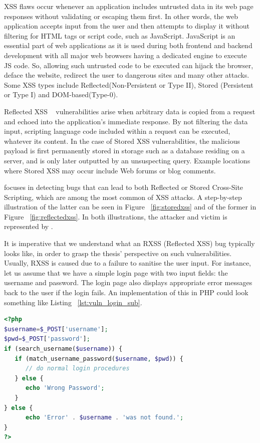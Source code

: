 XSS flaws occur whenever an application includes untrusted data in its web page responses without validating or escaping them first. In other words, the web application accepts input from the user and then attempts to display it without filtering for HTML tags or script code, such as JavaScript. JavaScript is an essential part of web applications as it is used during both frontend and backend development with all major web browsers having a dedicated engine to execute JS code. So, allowing such untrusted code to be executed can hijack the browser, deface the website, redirect the user to dangerous sites and many other attacks. Some XSS types include Reflected(Non-Persistent or Type II), Stored (Persistent or Type I) and DOM-based(Type-0).

Reflected XSS ~\cite{rxss_def} vulnerabilities arise when arbitrary data is copied from a request and echoed into the application's immediate response. By not filtering the data input, scripting language code included within a request can be executed, whatever its content. In the case of Stored XSS vulnerabilities, the malicious payload is first permanently stored in storage such as a database residing on a server, and is only later outputted by an unsuspecting query. Example locations where Stored XSS may occur include Web forums or blog comments. 

\pname{} focuses in detecting bugs that can lead to both Reflected or Stored Cross-Site Scripting, which are among the most common of XSS attacks. A step-by-step illustration of the latter can be seen in Figure ~\ref{fig:storedxss} and of the former in Figure ~\ref{fig:reflectedxss}. In both illustrations, the attacker and victim is represented by \pname{}.

It is imperative that we understand what an RXSS (Reflected XSS) bug typically looks like, in order to grasp the thesis' perspective on such vulnerabilities. Usually, RXSS is caused due to a failure to sanitise the user input. For instance, let us assume that we have a simple login page with two input fields: the username and password. The login page also displays appropriate error messages back to the user if the login fails. An implementation of this in PHP could look something like Listing ~\ref{lst:vuln_login_sub}.

\begin{lstlisting}[aboveskip=\baselineskip, showstringspaces=false, frame=single, language=PHP, caption={\textit{Vulnerable login form}}, numberstyle=\color{gray}, numbersep=5pt, label={lst:vuln_login_sub}]
<?php
$username=$_POST['username'];
$pwd=$_POST['password'];
if (search_username($username)) {
   if (match_username_password($username, $pwd)) {
      // do normal login procedures
   } else {
      echo 'Wrong Password';
   }
} else {
      echo 'Error' . $username . 'was not found.';
}
?>
\end{lstlisting}

